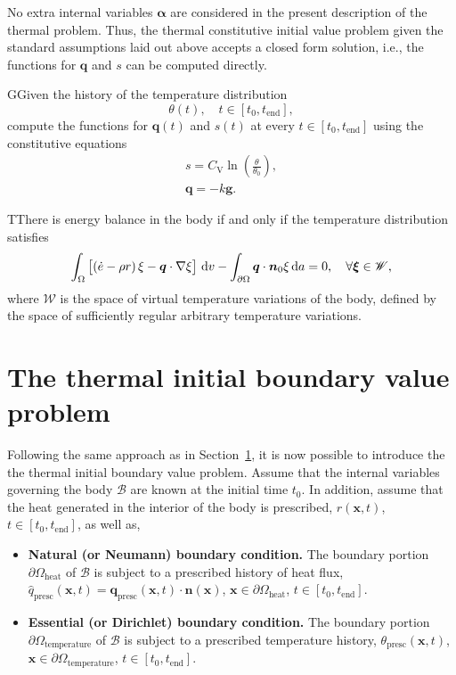 No extra internal variables \(\bm \alpha\) are considered in the present description of the thermal problem.
Thus, the thermal constitutive initial value problem given the standard assumptions laid out above accepts a closed form solution, i.e., the functions for \(\bm q\) and \(s\) can be computed directly.
\begin{problem}
GGiven the history of the temperature distribution
\[\theta(t),\quad t\in[t_0, t_\text{end}],\]
compute the functions for $\bm q(t)$ and \(s(t)\) at every $t\in [t_0, t_\text{end}]$ using the constitutive equations
\begin{gather}
    s =C_{\mathrm{V}} \ln \left(\frac{\theta}{\theta_{0}}\right),\\
    \bm q = -k\bm g.
\end{gather}
\end{problem}

\begin{problem}
TThere is energy balance in the body if and only if the temperature distribution satisfies
    \begin{equation}
        \int_\Omega   \left[\left(\dot e - \rho r\right) \xi - \bm q\cdot \nabla \xi\right]\,\mathrm{d} v - \int_{\partial\Omega} \bm q\cdot \bm n_0 \xi\,\mathrm{d} a = 0,\quad \forall \bm{\xi} \in \mathscr{W},
    \end{equation}
 where $\mathscr{W}$ is the space of virtual temperature variations of the body, defined by the space of sufficiently regular arbitrary temperature variations.
 \end{problem}

\section{The thermal initial boundary value problem}

Following the same approach as in Section~\ref{}, it is now possible to introduce the the thermal initial boundary value problem.
Assume that the internal variables governing the body \(\mathcal B\) are known at the initial time \(t_0\).
In addition, assume that the heat generated in the interior of the body is prescribed, \(r(\bm x, t)\), \(t\in[t_0, t_\text{end}]\), as well as,
\begin{itemize}
  \item \textbf{Natural (or Neumann) boundary condition.} The boundary portion \(\partial \Omega_\text{heat}\) of \(\mathcal B\) is subject to a prescribed history of heat flux, \(\hat q_\text{presc}(\bm x, t) = \bm q_\text{presc}(\bm x, t)\cdot \bm n(\bm x)\), \(\bm x \in \partial \Omega_\text{heat}\), \(t\in [t_0,t_\text{end}]\).
  \item \textbf{Essential (or Dirichlet) boundary condition.} The boundary portion \(\partial \Omega_\text{temperature}\) of \(\mathcal B\) is subject to a prescribed temperature history, \(\theta_\text{presc}(\bm x, t)\), \(\bm x \in \partial \Omega_\text{temperature}\), \(t\in [t_0,t_\text{end}]\).
\end{itemize}

